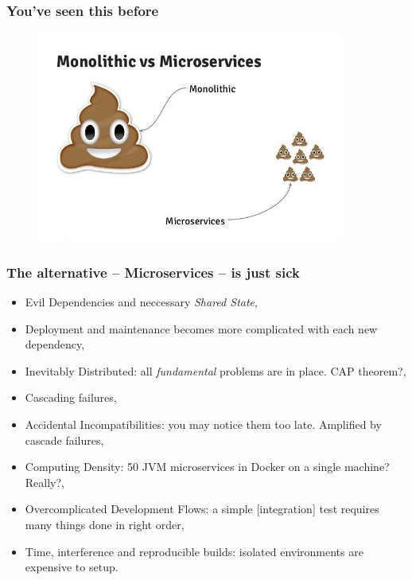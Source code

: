 \documentclass[usenames,dvipsnames]{beamer}
\begin{document}
\begin{frame}
\frametitle{You've seen this before}
\begin{figure}
    \includegraphics[width=0.9\textwidth]{media/mono-ms-joke.jpg}
\end{figure}
\end{frame}

\begin{frame}
\frametitle{The alternative -- Microservices -- is just sick}

\begin{itemize}
\item Evil Dependencies and neccessary \textit{Shared State},
\item Deployment and maintenance becomes more complicated with each new dependency,
\item Inevitably Distributed: all \textit{fundamental} problems are in place. CAP theorem?,
\item Cascading failures,
\item Accidental Incompatibilities: you may notice them too late. Amplified by cascade failures,
\item Computing Density: 50 JVM microservices in Docker on a single machine? Really?,
\item Overcomplicated Development Flows: a simple [integration\footnotemark[1]] test requires many things done in right order,
\item Time, interference and reproducible builds: isolated environments are expensive to setup.
\end{itemize}
\end{frame}
\end{document}
